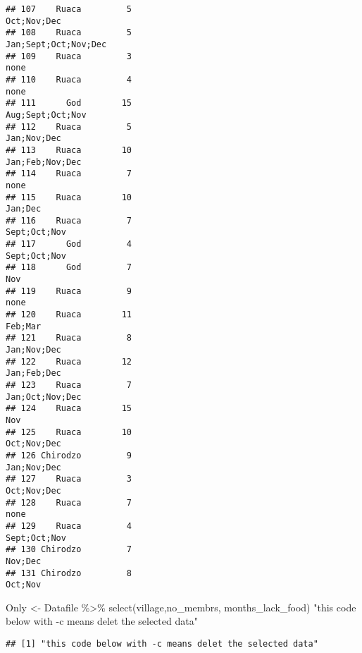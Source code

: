 \documentclass[
]{article}
\newenvironment{Shaded}{\begin{snugshade}}{\end{snugshade}}
\newcommand{\FunctionTok}[1]{\textcolor[rgb]{0.00,0.00,0.00}{#1}}
\newcommand{\NormalTok}[1]{#1}
\newcommand{\OtherTok}[1]{\textcolor[rgb]{0.56,0.35,0.01}{#1}}
\newcommand{\SpecialCharTok}[1]{\textcolor[rgb]{0.00,0.00,0.00}{#1}}
\newcommand{\StringTok}[1]{\textcolor[rgb]{0.31,0.60,0.02}{#1}}
\begin{document}
\begin{verbatim}
## 107    Ruaca         5                                    Oct;Nov;Dec
## 108    Ruaca         5                           Jan;Sept;Oct;Nov;Dec
## 109    Ruaca         3                                           none
## 110    Ruaca         4                                           none
## 111      God        15                               Aug;Sept;Oct;Nov
## 112    Ruaca         5                                    Jan;Nov;Dec
## 113    Ruaca        10                                Jan;Feb;Nov;Dec
## 114    Ruaca         7                                           none
## 115    Ruaca        10                                        Jan;Dec
## 116    Ruaca         7                                   Sept;Oct;Nov
## 117      God         4                                   Sept;Oct;Nov
## 118      God         7                                            Nov
## 119    Ruaca         9                                           none
## 120    Ruaca        11                                        Feb;Mar
## 121    Ruaca         8                                    Jan;Nov;Dec
## 122    Ruaca        12                                    Jan;Feb;Dec
## 123    Ruaca         7                                Jan;Oct;Nov;Dec
## 124    Ruaca        15                                            Nov
## 125    Ruaca        10                                    Oct;Nov;Dec
## 126 Chirodzo         9                                    Jan;Nov;Dec
## 127    Ruaca         3                                    Oct;Nov;Dec
## 128    Ruaca         7                                           none
## 129    Ruaca         4                                   Sept;Oct;Nov
## 130 Chirodzo         7                                        Nov;Dec
## 131 Chirodzo         8                                        Oct;Nov
\end{verbatim}

\begin{Shaded}
\begin{Highlighting}[]
\NormalTok{Only }\OtherTok{\textless{}{-}}\NormalTok{ Datafile }\SpecialCharTok{\%\textgreater{}\%} 
  \FunctionTok{select}\NormalTok{(village,no\_membrs, months\_lack\_food)}
\StringTok{"this code below with {-}c means delet the selected data"}
\end{Highlighting}
\end{Shaded}

\begin{verbatim}
## [1] "this code below with -c means delet the selected data"
\end{verbatim}
\end{document}
